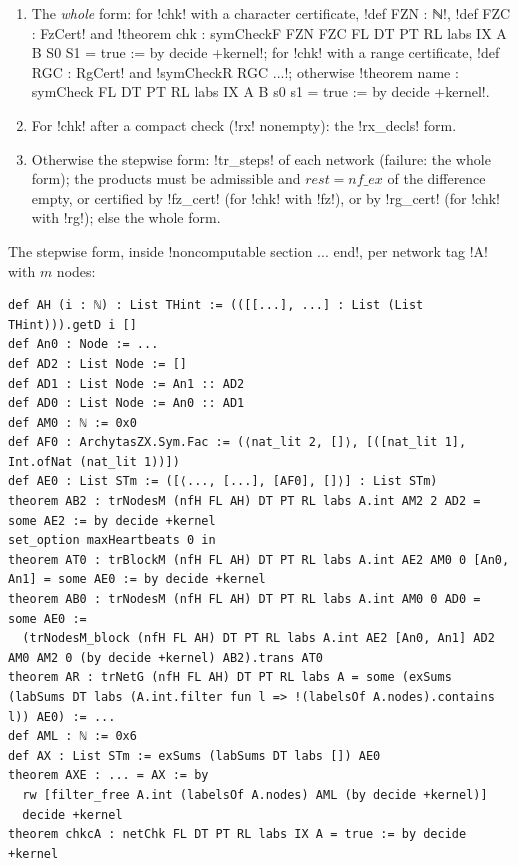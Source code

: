 {{{\begin{algorithm}\label{alg:lean-export-sym-checkdecls}
\begin{enumerate}
\item The \emph{whole} form: for \lexlean!chk! with a character certificate,
\lexlean!def FZN : ℕ!, \lexlean!def FZC : FzCert! and
\lexlean!theorem chk : symCheckF FZN FZC FL DT PT RL labs IX A B S0 S1 = true := by decide +kernel!;
for \lexlean!chk! with a range certificate, \lexlean!def RGC : RgCert! and \lexlean!symCheckR RGC ...!;
otherwise \lexlean!theorem name : symCheck FL DT PT RL labs IX A B s0 s1 = true := by decide +kernel!.
\item For \lexlean!chk! after a compact check (\lexpy!rx! nonempty): the \lexpy!rx_decls! form.
\item Otherwise the stepwise form: \lexpy!tr_steps! of each network (failure: the whole form);
the products must be admissible and $\mathit{rest} = \mathit{nf\_ex}$ of the difference empty,
or certified by \lexpy!fz_cert! (for \lexlean!chk! with \lexpy!fz!), or by \lexpy!rg_cert! (for \lexlean!chk!
with \lexpy!rg!); else the whole form.
\end{enumerate}
\end{algorithm}
The stepwise form, inside \lexlean!noncomputable section ... end!, per network tag \lexlean!A!
with $m$ nodes:
\begin{lstlisting}[style=lexlean]
def AH (i : ℕ) : List THint := (([[...], ...] : List (List THint))).getD i []
def An0 : Node := ...
def AD2 : List Node := []
def AD1 : List Node := An1 :: AD2
def AD0 : List Node := An0 :: AD1
def AM0 : ℕ := 0x0
def AF0 : ArchytasZX.Sym.Fac := (⟨nat_lit 2, []⟩, [([nat_lit 1], Int.ofNat (nat_lit 1))])
def AE0 : List STm := ([⟨..., [...], [AF0], []⟩] : List STm)
theorem AB2 : trNodesM (nfH FL AH) DT PT RL labs A.int AM2 2 AD2 = some AE2 := by decide +kernel
set_option maxHeartbeats 0 in
theorem AT0 : trBlockM (nfH FL AH) DT PT RL labs A.int AE2 AM0 0 [An0, An1] = some AE0 := by decide +kernel
theorem AB0 : trNodesM (nfH FL AH) DT PT RL labs A.int AM0 0 AD0 = some AE0 :=
  (trNodesM_block (nfH FL AH) DT PT RL labs A.int AE2 [An0, An1] AD2 AM0 AM2 0 (by decide +kernel) AB2).trans AT0
theorem AR : trNetG (nfH FL AH) DT PT RL labs A = some (exSums (labSums DT labs (A.int.filter fun l => !(labelsOf A.nodes).contains l)) AE0) := ...
def AML : ℕ := 0x6
def AX : List STm := exSums (labSums DT labs []) AE0
theorem AXE : ... = AX := by
  rw [filter_free A.int (labelsOf A.nodes) AML (by decide +kernel)]
  decide +kernel
theorem chkcA : netChk FL DT PT RL labs IX A = true := by decide +kernel

\end{lstlisting}}}}
